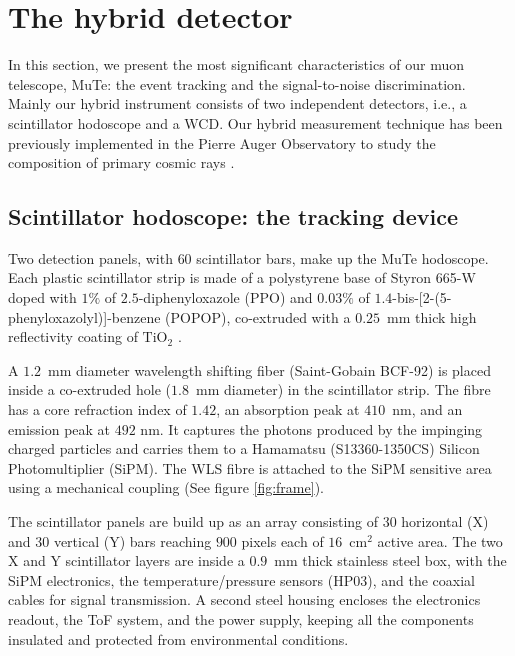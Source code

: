 \documentclass[letterpaper,11pt]{article}
\begin{document}
\section{The hybrid detector}
\label{detector}
In this section, we present the most significant characteristics of our muon telescope, MuTe: the event tracking and the signal-to-noise discrimination. Mainly our hybrid instrument consists of two independent detectors, i.e., a scintillator hodoscope and a WCD. Our hybrid measurement technique has been previously implemented in the Pierre Auger Observatory to study the composition of primary cosmic rays \cite{aab2017muon, aab2016prototype}.

\subsection{Scintillator hodoscope: the tracking device}
Two detection panels, with $60$ scintillator bars, make up the MuTe hodoscope. Each plastic scintillator strip is made of a polystyrene base of Styron 665-W doped with $1\%$ of $2.5$-diphenyloxazole (PPO) and $0.03\%$ of $1.4$-bis-[2-(5-phenyloxazolyl)]-benzene (POPOP), co-extruded with a $0.25$~mm thick high reflectivity coating of $\text{TiO}_{\text{2}}$ \cite{PlaDalmau2003}. 

A $1.2$~mm diameter wavelength shifting fiber (Saint-Gobain BCF-92) is placed inside a co-extruded hole ($1.8$~mm diameter) in the scintillator strip. The fibre has a core refraction index of $1.42$, an absorption peak at $410$~nm, and an emission peak at $492$ nm. It captures the photons produced by the impinging charged particles and carries them to a Hamamatsu (S13360-1350CS) Silicon Photomultiplier (SiPM). The WLS fibre is attached to the SiPM sensitive area using a mechanical coupling (See figure \ref{fig:frame}). 

The scintillator panels are build up as an array consisting of $30$ horizontal (X) and $30$ vertical (Y) bars reaching $900$ pixels each of $16$~cm$^2$ active area. The two X and Y scintillator layers are inside a $0.9$~mm thick stainless steel box, with the SiPM electronics, the temperature/pressure sensors (HP03), and the coaxial cables for signal transmission. A second steel housing encloses the electronics readout, the ToF system, and the power supply, keeping all the components insulated and protected from environmental conditions. 
\end{document}
